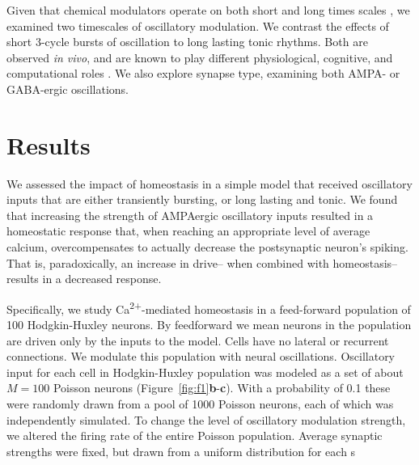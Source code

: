 \documentclass{article}
\begin{document}
Given that chemical modulators operate on both short and long times scales \cite{Marinelli2014,Marder2014,Cohen2015,Daw2002}, we examined two timescales of oscillatory modulation. We contrast the effects of short 3-cycle bursts of oscillation to long lasting tonic rhythms. Both are observed {\textit{in vivo}}, and are known to play different physiological, cognitive, and computational roles \cite{Lundqvist2016,vanEde2018,Peterson2017}. We also explore synapse type, examining both AMPA- or GABA-ergic oscillations. 


\section*{Results}
We assessed the impact of homeostasis in a simple model that received oscillatory inputs that are either transiently bursting, or long lasting and tonic. We found that increasing the strength of AMPAergic oscillatory inputs resulted in a homeostatic response that, when reaching an appropriate level of average calcium, overcompensates to actually decrease the postsynaptic neuron's spiking. That is, paradoxically, an increase in drive-- when combined with homeostasis--results in a decreased response. 

Specifically, we study Ca\textsuperscript{2+}-mediated homeostasis in a feed-forward population of 100 Hodgkin-Huxley neurons. By feedforward we mean neurons in the population are driven only by the inputs to the model. Cells have no lateral or recurrent connections. We modulate this population with neural oscillations. Oscillatory input for each cell in Hodgkin-Huxley population was modeled as a set of about $M=100$ Poisson neurons (Figure~\ref{fig:f1}\textbf{b}-\textbf{c}). With a probability of 0.1 these were randomly drawn from a pool of 1000 Poisson neurons, each of which was independently simulated. To change the level of oscillatory modulation strength, we altered the firing rate of the entire Poisson population. Average synaptic strengths were fixed, but drawn from a uniform distribution for each s
\end{document}
